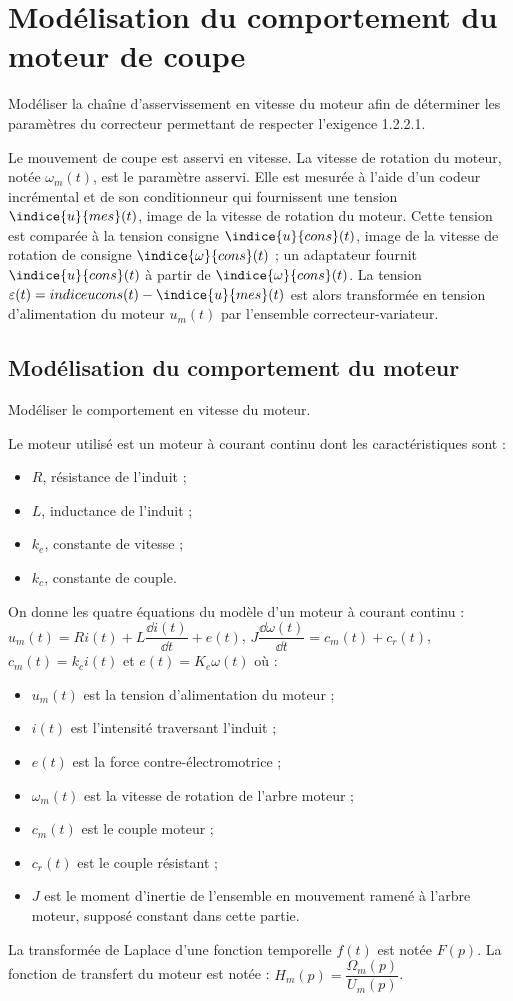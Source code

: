 \section{Modélisation du comportement du moteur de coupe}
\begin{obj}
Modéliser la chaîne d’asservissement en vitesse du moteur afin de déterminer les paramètres du correcteur permettant de respecter l’exigence 1.2.2.1.
\end{obj}


Le mouvement de coupe est asservi en vitesse. La vitesse de rotation du moteur, notée $\omega_m (t)$, est le paramètre asservi. Elle est mesurée à l’aide d’un codeur incrémental et de son conditionneur qui fournissent une tension $\indice{u}{mes}(t)$, image de la vitesse de rotation du moteur. Cette tension est comparée à la tension consigne $\indice{u}{cons} (t)$, image de la vitesse de rotation de consigne $\indice{\omega}{cons} (t)$ ; un adaptateur fournit $\indice{u}{cons}(t)$ à partir de $\indice{\omega}{cons} (t)$. La tension $\varepsilon(t)=indice{u}{cons}(t) - \indice{u}{mes}(t)$ est alors transformée en tension d’alimentation du moteur $u_m (t)$ par l’ensemble correcteur-variateur.



\subsection*{Modélisation du comportement du moteur}
\begin{obj}
Modéliser le comportement en vitesse du moteur.
\end{obj}


Le moteur utilisé est un moteur à courant continu dont les caractéristiques sont :
\begin{itemize}
\item $R$, résistance de l’induit ;
\item $L$, inductance de l’induit ;
\item $k_e$, constante de vitesse ;
\item $k_c$, constante de couple.
\end{itemize}
On donne les quatre équations du modèle d’un moteur à courant continu :
$u_m (t)=R i(t)+L \dfrac{\dd i(t)}{\dd t}+e(t)$, $J \dfrac{\dd \omega(t)}{\dd t}=c_m (t)+c_r (t)$, $c_m (t)=k_c i(t)$ et $e(t)=K_e \omega(t)$ où :
\begin{itemize}
\item $u_m (t)$ est la tension d’alimentation du moteur ;
\item $i(t)$ est l’intensité traversant l’induit ;
\item $e(t)$ est la force contre-électromotrice ;
\item $\omega_m (t)$ est la vitesse de rotation de l’arbre moteur ;
\item $c_m (t)$ est le couple moteur ;
\item $c_r (t)$ est le couple résistant ;
\item $J$ est le moment d’inertie de l’ensemble en mouvement ramené à l’arbre moteur, supposé constant dans cette partie.
\end{itemize}

La transformée de Laplace d’une fonction temporelle $f(t)$ est notée $F(p)$.
La fonction de transfert du moteur est notée : $H_m (p)= \dfrac{\Omega_m (p)}{U_m (p)}$.


